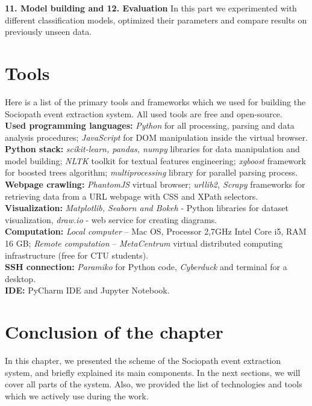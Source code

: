 \textbf{11. Model building and 12. Evaluation} In this part we experimented with different classification models, optimized their parameters and compare results on previously unseen data. \\

\section{Tools}

Here is a list of the primary tools and frameworks which we used for building the Sociopath event extraction system. All used tools are free and open-source.\\

\noindent\textbf{Used programming languages:} \textit{Python} for all processing, parsing and data analysis procedures; \textit{JavaScript} for DOM manipulation inside the virtual browser.\\

\noindent\textbf{Python stack:} \textit{scikit-learn, pandas, numpy} libraries for data manipulation and model building; \textit{NLTK} toolkit for textual features engineering;  \textit{xgboost} framework for boosted trees algorithm; \textit{multiprocessing} library for parallel parsing process. \\

\noindent\textbf{Webpage crawling:} \textit{PhantomJS} virtual browser; \textit{urllib2, Scrapy} frameworks for retrieving data from a URL webpage with CSS and XPath selectors.\\

\noindent\textbf{Visualization:} \textit{Matplotlib, Seaborn and Bokeh} - Python libraries for dataset visualization, \textit{draw.io} - web service for creating diagrams. \\

\noindent\textbf{Computation:} \textit{Local computer} -- Mac OS, Processor 2,7GHz Intel Core i5, RAM 16 GB; \textit{Remote computation} -- \textit{MetaCentrum} virtual distributed computing infrastructure (free for CTU students).\\

\noindent\textbf{SSH connection:} \textit{Paramiko} for Python code, \textit{Cyberduck} and terminal for a desktop.\\

\noindent\textbf{IDE:} PyCharm IDE and Jupyter Notebook.\\

\section*{Conclusion of the chapter}
In this chapter, we presented the scheme of the Sociopath event extraction system, and briefly explained its main components. In the next sections, we will cover all parts of the system. Also, we provided the list of technologies and tools which we actively use during the work. 